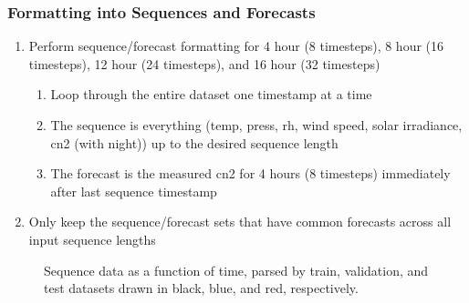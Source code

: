 \subsubsection{Formatting into Sequences and Forecasts}



\begin{enumerate}
	\item Perform sequence/forecast formatting for 4 hour (8 timesteps), 8 hour (16 timesteps), 12 hour (24 timesteps), and 16 hour (32 timesteps)
	\begin{enumerate}
		\item Loop through the entire dataset one timestamp at a time
		\item The sequence is everything (temp, press, rh, wind speed, solar irradiance, cn2 (with night)) up to the desired sequence length
		\item The forecast is the measured cn2 for 4 hours (8 timesteps) immediately after last sequence timestamp
	\end{enumerate}
	\item Only keep the sequence/forecast sets that have common forecasts across all input sequence lengths
\end{enumerate}

\label{sec:wx_seq_hist}
\begin{figure}[p!]
	\centering
	\hfill
	\hfill
	\hfill
	\caption{Sequence data as a function of time, parsed by train, validation, and test datasets drawn in black, blue, and red, respectively.}
	\label{fig:sequence_temporal}
\end{figure}

